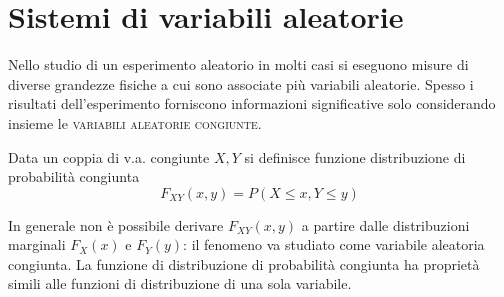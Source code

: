 \section{Sistemi di variabili aleatorie}
Nello studio di un esperimento aleatorio in molti casi si eseguono misure di diverse grandezze fisiche a cui sono associate più variabili aleatorie. Spesso i risultati dell'esperimento forniscono informazioni significative solo considerando insieme le \textsc{variabili aleatorie congiunte}.

Data un coppia di v.a. congiunte $X,Y$ si definisce funzione distribuzione di probabilità congiunta
\begin{equation}
F_{XY}(x,y)=P(X\leq x,Y\leq y)
\end{equation}\label{eq:funz_dist_prob_congiunta}

In generale non è possibile derivare $F_{XY}(x,y)$ a partire dalle distribuzioni marginali $F_X(x)$ e $F_Y(y)$: il fenomeno va studiato come variabile aleatoria congiunta.
La funzione di distribuzione di probabilità congiunta ha proprietà simili alle funzioni di distribuzione di una sola variabile.\\

